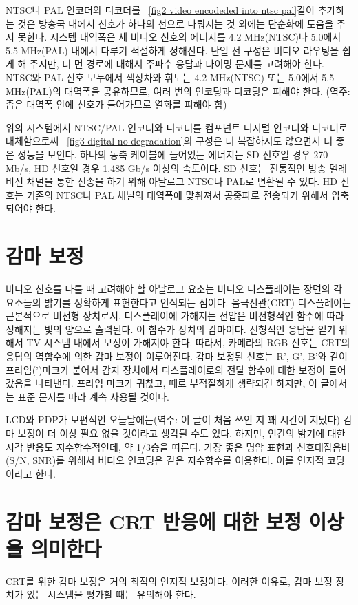 NTSC나 PAL 인코더와 디코더를 \figurename~\ref{fig2 video encodeded into ntsc pal}\와 같이 추가하는 것은 방송국 내에서 신호가 하나의 선으로 다뤄지는 것 외에는 단순화에 도움을 주지 못한다.
시스템 대역폭은 세 비디오 신호의 에너지를 4.2 MHz(NTSC)나 5.0에서 5.5 MHz(PAL) 내에서 다루기 적절하게 정해진다.
단일 선 구성은 비디오 라우팅을 쉽게 해 주지만, 더 먼 경로에 대해서 주파수 응답과 타이밍 문제를 고려해야 한다.
NTSC와 PAL 신호 모두에서 색상차와 휘도는 4.2 MHz(NTSC) 또는 5.0에서 5.5 MHz(PAL)의 대역폭을 공유하므로, 여러 번의 인코딩과 디코딩은 피해야 한다.
(역주: 좁은 대역폭 안에 신호가 들어가므로 열화를 피해야 함)


위의 시스템에서 NTSC/PAL 인코더와 디코더를 컴포넌트 디지털 인코더와 디코더로 대체함으로써 \figurename~\ref{fig3 digital no degradation}의 구성은 더 복잡하지도 않으면서 더 좋은 성능을 보인다.
하나의 동축 케이블에 들어있는 에너지는 SD 신호일 경우 270 Mb/s, HD 신호일 경우 1.485 Gb/s 이상의 속도이다.
SD 신호는 전통적인 방송 텔레비전 채널을 통한 전송을 하기 위해 아날로그 NTSC나 PAL로 변환될 수 있다.
HD 신호는 기존의 NTSC나 PAL 채널의 대역폭에 맞춰져서 공중파로 전송되기 위해서 압축되어야 한다.

\section{감마 보정}
비디오 신호를 다룰 때 고려해야 할 아날로그 요소는 비디오 디스플레이는 장면의 각 요소들의 밝기를 정확하게 표현한다고 인식되는 점이다.
음극선관(CRT) 디스플레이는 근본적으로 비선형 장치로서, 디스플레이에 가해지는 전압은 비선형적인 함수에 따라 정해지는 빛의 양으로 출력된다.
이 함수가 장치의 감마이다. 선형적인 응답을 얻기 위해서 TV 시스템 내에서 보정이 가해져야 한다.
따라서, 카메라의 RGB 신호는 CRT의 응답의 역함수에 의한 감마 보정이 이루어진다. 감마 보정된 신호는 R', G', B'와 같이 프라임(')마크가 붙어서 감지 장치에서 디스플레이로의 전달 함수에 대한 보정이 들어갔음을 나타낸다.
프라임 마크가 귀찮고, 때로 부적절하게 생략되긴 하지만, 이 글에서는 표준 문서를 따라 계속 사용될 것이다.


LCD와 PDP가 보편적인 오늘날에는(역주: 이 글이 처음 쓰인 지 꽤 시간이 지났다) 감마 보정이 더 이상 필요 없을 것이라고 생각될 수도 있다.
하지만, 인간의 밝기에 대한 시각 반응도 지수함수적인데, 약 1/3승을 따른다. 가장 좋은 명암 표현과 신호대잡음비(S/N, SNR)를 위해서 비디오 인코딩은 같은 지수함수를 이용한다. 이를 인지적 코딩이라고 한다.

\section{감마 보정은 CRT 반응에 대한 보정 이상을 의미한다}
CRT를 위한 감마 보정은 거의 최적의 인지적 보정이다. 이러한 이유로, 감마 보정 장치가 있는 시스템을 평가할 때는 유의해야 한다.


